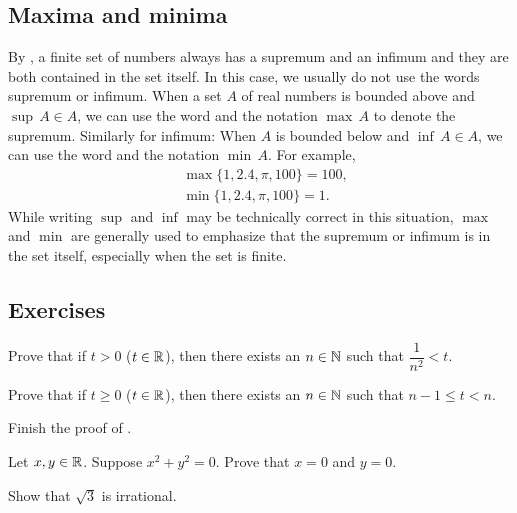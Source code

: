 \subsection{Maxima and minima}

By ,
a finite set of numbers always has a supremum and an infimum
and they are both contained in the set itself.
In this case, we usually do not use the words supremum or infimum.
When a set $A$ of real numbers is bounded above and
$\sup\, A \in A$, we can use the word
\emph{} and the notation $\max\, A$ to denote the supremum.
Similarly for infimum: When $A$ is bounded below
and $\inf\, A \in A$, we can use the
word \emph{} and the notation $\min\, A$.
For example,
\begin{align*}
& \max \{ 1,2.4,\pi,100 \} = 100 , \\
& \min \{ 1,2.4,\pi,100 \} = 1 .
\end{align*}
While writing $\sup$ and $\inf$ may be technically
correct in this situation, $\max$ and
$\min$ are generally used to emphasize that the supremum or infimum
is in the set itself, especially when the set is finite.

\subsection{Exercises}

\begin{exercise}
Prove that
if $t > 0$ ($t \in {\mathbb{R}}$), then there exists an $n \in {\mathbb{N}}$ such that
$\dfrac{1}{n^2} < t$.
\end{exercise}

\begin{exercise}
Prove that
if $t \geq 0$ ($t \in {\mathbb{R}}$), then there exists an $n \in {\mathbb{N}}$ such that $n-1 \leq t < n$.
\end{exercise}

\begin{exercise}
Finish the proof of .
\end{exercise}

\begin{exercise}
Let $x, y \in {\mathbb{R}}$.  Suppose $x^2 + y^2 = 0$.  Prove that $x = 0$ and $y = 0$.
\end{exercise}

\begin{exercise}
Show that $\sqrt{3}$ is irrational.
\end{exercise}

